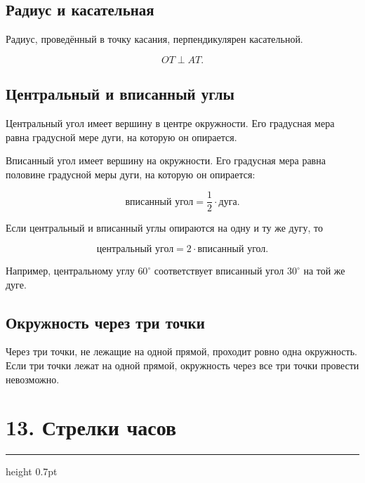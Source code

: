 \documentclass[a4paper,12pt]{article}
\newcommand{\sectionline}{%
    \vspace{-0.15em}
    {\color{accent}\hrule height 0.7pt}
    \vspace{0.55em}
}
\newcommand{\formula}[1]{%
    \[
        \boxed{\displaystyle #1}
    \]
}
\begin{document}
\subsection*{Радиус и касательная}

Радиус, проведённый в точку касания, перпендикулярен касательной.

\begin{center}
\end{center}

\formula{OT\perp AT.}

\subsection*{Центральный и вписанный углы}

Центральный угол имеет вершину в центре окружности. Его градусная мера равна
градусной мере дуги, на которую он опирается.

Вписанный угол имеет вершину на окружности. Его градусная мера равна половине
градусной меры дуги, на которую он опирается:

\formula{\text{вписанный угол}=\frac12\cdot\text{дуга}.}

Если центральный и вписанный углы опираются на одну и ту же дугу, то

\formula{\text{центральный угол}=2\cdot\text{вписанный угол}.}

Например, центральному углу $60^\circ$ соответствует вписанный угол
$30^\circ$ на той же дуге.

\subsection*{Окружность через три точки}

Через три точки, не лежащие на одной прямой, проходит ровно одна окружность.
Если три точки лежат на одной прямой, окружность через все три точки провести
невозможно.

\section*{\color{darkaccent}13. Стрелки часов}
\sectionline
\end{document}
